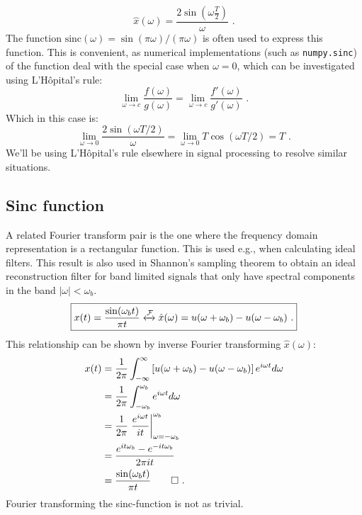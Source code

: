 \begin{equation}
\boxed{
\hat{x}(\omega) = \frac{2\sin(\omega \frac{T}{2})}{\omega}\,\,.
}
\end{equation}
The function $\mathrm{sinc}(\omega)=\sin(\pi\omega)/(\pi\omega)$ is often used to express this function. This is convenient, as numerical implementations (such as \verb|numpy.sinc|) of the function deal with the special case when $\omega=0$, which can be investigated using L'H\^{o}pital's rule:
\begin{equation}
\lim_{\omega \rightarrow c} \frac{f(\omega)}{g(\omega)} = \lim_{\omega \rightarrow c} \frac{f'(\omega)}{g'(\omega)}\,\,.
\end{equation}
Which in this case is:
\begin{equation}
\lim_{\omega \rightarrow 0} \frac{2\sin(\omega T/2)}{\omega} = \lim_{\omega \rightarrow 0} T\cos(\omega T/2 ) = T\,\,.
\end{equation}
We'll be using L'H\^{o}pital's rule elsewhere in signal processing to resolve similar situations.

\subsection{Sinc function}
A related Fourier transform pair is the one where the frequency domain representation is a rectangular function. This is used e.g., when calculating ideal filters. This result is also used in Shannon's sampling theorem to obtain an ideal reconstruction filter for band limited signals that only have spectral components in the band
$|\omega| < \omega_b$.
\begin{equation}
\boxed{
x(t) = \frac{\sin(\omega_b t)}{\pi t} \xleftrightarrow{\mathcal{F}} \hat{x}(\omega) = u(\omega+\omega_b) - u(\omega-\omega_b)\,\,.
}
\label{eq:ft:sinc}
\end{equation}
This relationship can be shown by inverse Fourier transforming $\hat{x}(\omega)$:
\begin{align}
x(t) &= \frac{1}{2\pi}\int_{-\infty}^{\infty} \left[u(\omega+\omega_b) - u(\omega-\omega_b)\right] e^{i\omega t}d\omega \\
 &= \frac{1}{2\pi}\int_{-\omega_b}^{\omega_b} e^{i\omega t}d\omega \\
 &= \frac{1}{2\pi}\left.\frac{e^{i\omega t}}{it}\right|_{\omega=-\omega_b}^{\omega_b} \\
 &= \frac{e^{i t \omega_b} - e^{-i t \omega_b} }{ 2\pi i t} \\
 &= \frac{\sin(\omega_b t)}{\pi t}\qed\,\,.
\end{align}
Fourier transforming the sinc-function is not as trivial.

